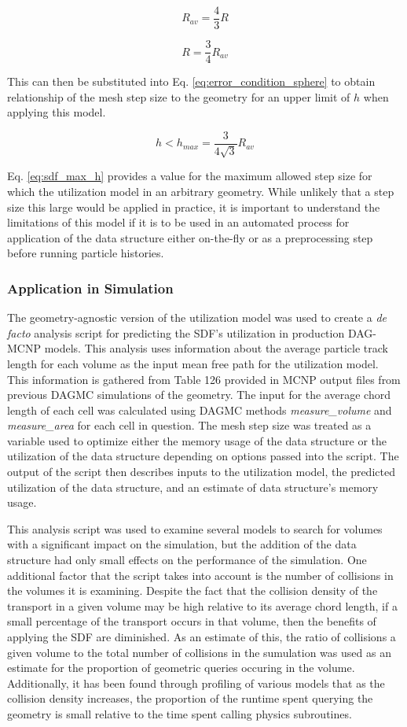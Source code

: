 $$R_{av} = \frac{4}{3}R $$

$$ R = \frac{3}{4} R_{av} $$

This can then be substituted into Eq. \ref{eq:error_condition_sphere}
to obtain relationship of the mesh step size to the geometry for an upper limit
of $h$ when applying this model.

\begin{equation}
 h < h_{max} =  \frac{3}{4\sqrt{3}} R_{av} 
\label{eq:sdf_max_h}
\end{equation}

Eq. \ref{eq:sdf_max_h} provides a value for the maximum allowed step size for
which the utilization model in an arbitrary geometry. While unlikely that a step
size this large would be applied in practice, it is important to understand the
limitations of this model if it is to be used in an automated process for
application of the data structure either on-the-fly or as a preprocessing step
before running particle histories.

\subsubsection{Application in Simulation}

The geometry-agnostic version of the utilization model was used to create a
\textit{de facto} analysis script for predicting the SDF's utilization in
production DAG-MCNP models. This analysis uses information about the average
particle track length for each volume as the input mean free path for the
utilization model. This information is gathered from Table 126 provided in MCNP
output files from previous DAGMC simulations of the geometry. The input for the
average chord length of each cell was calculated using DAGMC methods
\textit{measure\_volume} and \textit{measure\_area} for each cell in
question. The mesh step size was treated as a variable used to optimize either
the memory usage of the data structure or the utilization of the data structure
depending on options passed into the script. The output of the script then
describes inputs to the utilization model, the predicted utilization of the data
structure, and an estimate of data structure's memory usage.

This analysis script was used to examine several models to search for volumes
with a significant impact on the simulation, but the addition of the data
structure had only small effects on the performance of the simulation. One
additional factor that the script takes into account is the number of collisions
in the volumes it is examining. Despite the fact that the collision density of
the transport in a given volume may be high relative to its average chord
length, if a small percentage of the transport occurs in that volume, then the
benefits of applying the SDF are diminished. As an estimate of this, the ratio
of collisions a given volume to the total number of collisions in the sumulation
was used as an estimate for the proportion of geometric queries occuring in the
volume.  Additionally, it has been found through profiling of various models
that as the collision density increases, the proportion of the runtime spent
querying the geometry is small relative to the time spent calling physics
subroutines.

